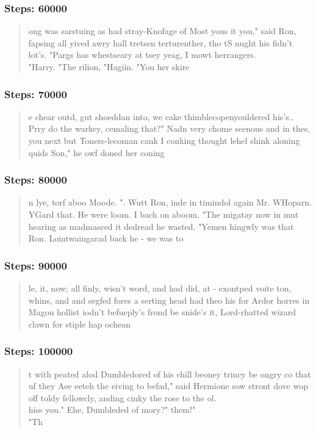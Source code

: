 \documentclass{article}
\begin{document}
\subsubsection*{Steps: 60000}
\begin{quote}
	\smaller
	ong was sarstuing as had stray-Knofage of Most yous it you," said Ron, fapsing all yived awry hall tretsen terturenther, tho tS nught his fidn't lot's. "Pargs has whestseary at tsey yeag, I mowt herrangers.\\
	"Harry. "The rilion, "Hagiin. "You her skire
\end{quote}

\subsubsection*{Steps: 70000}
\begin{quote}
	\smaller
	e chear outd, gut shoeddan into, we cake thimblecopenyouldered his's..  Prry do the warkey, cemaling that?" Nadn very chome seenous and in thes, you next but Toners-lecoman cank I conking thought lehel shink aloning quids Son," he owf doned her coning
\end{quote}

\subsubsection*{Steps: 80000}
\begin{quote}
	\smaller
	n lye, torf aboo Moode.  ". Wutt Ron, inde in timindol again Mr. WHoparn.  YGard that. He were loom.  I bach on aboom.
	"The migatay now in mut hearing as madmasced it dedread he wasted.  "Yemen hingwly was that Ron. Lointwaingarad back he - we was to
\end{quote}

\subsubsection*{Steps: 90000}
\begin{quote}
	\smaller
	le, it, now; all finly, wisn't word, and had did, at - exontped voite ton, whins, and and segfed fores a serting head had theo his for Ardor horres in Magou hollist iodn't befueply's frond be snide's it, Lord-rhatted wizard clawn for stiple hap ochean
\end{quote}

\subsubsection*{Steps: 100000}
\begin{quote}
	\smaller
	t with peated alod Dumbledored of his chill beoney trincy be ongry co that uf they Aee eeteh the eiving to befad," said Hermione sow stront dove wop off toldy fellowcly, anding cinky the rose to the ol.\\
	hiss you." Ehe, Dumbleded of mory?"  them!"\\
	"Th
\end{quote}
\end{document}
